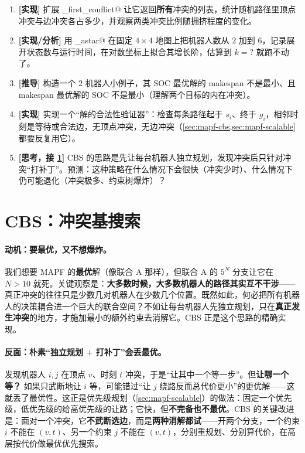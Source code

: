 \begin{exercise}
\begin{enumerate}
  \item \textbf{[实现]} 扩展 \verb@find_first_conflict@ 让它返回\textbf{所有}冲突的列表，统计随机路径里顶点冲突与边冲突各占多少，并观察两类冲突比例随拥挤程度的变化。
  \item \textbf{[实现/分析]} 用 \verb@joint_astar@ 在固定 $4\times 4$ 地图上把机器人数从 $2$ 加到 $6$，记录展开状态数与运行时间，在对数坐标上拟合其增长阶，估算到 $k=?$ 就跑不动了。
  \item \textbf{[推导]} 构造一个 $2$ 机器人小例子，其 SOC 最优解的 makespan 不是最小、且 makespan 最优解的 SOC 不是最小（理解两个目标的内在冲突）。
  \item \textbf{[实现]} 实现一个“解的合法性验证器”：检查每条路径起于 $s_i$、终于 $g_i$，相邻时刻是等待或合法边，无顶点冲突，无边冲突（\cref{sec:mapf-cbs,sec:mapf-scalable} 都要反复用它）。
  \item \textbf{[思考，接 \cref{sec:mapf-cbs}]} CBS 的思路是先让每台机器人独立规划，发现冲突后只针对冲突“打补丁”。预测：这种策略在什么情况下会很快（冲突少时）、什么情况下仍可能退化（冲突极多、约束树爆炸）？
\end{enumerate}
\end{exercise}

\section{CBS：冲突基搜索}
\label{sec:mapf-cbs}

\paragraph{动机：要最优，又不想爆炸。}
我们想要 MAPF 的\textbf{最优}解（像联合 A\* 那样），但联合 A\* 的 $5^N$ 分支让它在 $N>10$ 就死。关键观察是：\textbf{大多数时候，大多数机器人的路径其实互不干涉}——真正冲突的往往只是少数几对机器人在少数几个位置。既然如此，何必把所有机器人的决策耦合进一个巨大的联合空间？不如让每台机器人先独立规划，只在\textbf{真正发生冲突}的地方，才施加最小的额外约束去消解它。CBS 正是这个思路的精确实现。

\paragraph{反面：朴素“独立规划 $+$ 打补丁”会丢最优。}
发现机器人 $i,j$ 在顶点 $v$、时刻 $t$ 冲突，于是“让其中一个等一步”。但\textbf{让哪一个等？} 如果只武断地让 $i$ 等，可能错过“让 $j$ 绕路反而总代价更小”的更优解——这就丢了最优性。这正是优先级规划（\cref{sec:mapf-scalable}）的做法：固定一个优先级，低优先级的给高优先级的让路；它快，但\textbf{不完备也不最优}。CBS 的关键改进是：面对一个冲突，它\textbf{不武断选边}，而是\textbf{两种消解都试}——开两个分支，一个约束 $i$ 不能在 $(v,t)$、另一个约束 $j$ 不能在 $(v,t)$，分别重规划、分别算代价，在高层按代价做最优优先搜索。

